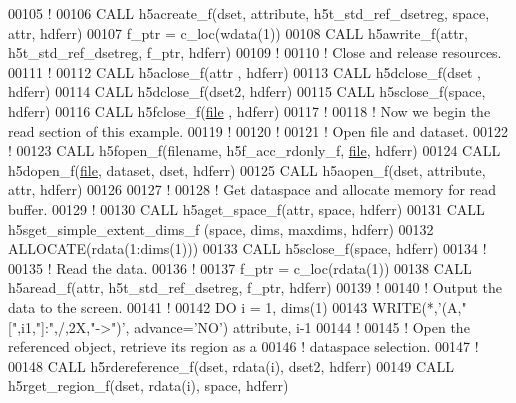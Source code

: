 \begin{DoxyCode}
00105   \textcolor{comment}{!}
00106   \textcolor{keyword}{CALL }h5acreate\_f(dset, attribute, h5t\_std\_ref\_dsetreg, space, attr, hdferr)
00107   f\_ptr = c\_loc(wdata(1))
00108   \textcolor{keyword}{CALL }h5awrite\_f(attr, h5t\_std\_ref\_dsetreg, f\_ptr, hdferr)
00109   \textcolor{comment}{!}
00110   \textcolor{comment}{! Close and release resources.}
00111   \textcolor{comment}{!}
00112   \textcolor{keyword}{CALL }h5aclose\_f(attr , hdferr)
00113   \textcolor{keyword}{CALL }h5dclose\_f(dset , hdferr)
00114   \textcolor{keyword}{CALL }h5dclose\_f(dset2, hdferr)
00115   \textcolor{keyword}{CALL }h5sclose\_f(space, hdferr)
00116   \textcolor{keyword}{CALL }h5fclose\_f(\hyperlink{structfile}{file} , hdferr)
00117   \textcolor{comment}{!}
00118   \textcolor{comment}{! Now we begin the read section of this example.}
00119   \textcolor{comment}{!}
00120   \textcolor{comment}{!}
00121   \textcolor{comment}{! Open file and dataset.}
00122   \textcolor{comment}{!}
00123   \textcolor{keyword}{CALL }h5fopen\_f(filename, h5f\_acc\_rdonly\_f, \hyperlink{structfile}{file}, hdferr)
00124   \textcolor{keyword}{CALL }h5dopen\_f(\hyperlink{structfile}{file}, dataset, dset, hdferr)
00125   \textcolor{keyword}{CALL }h5aopen\_f(dset, attribute, attr, hdferr)
00126 
00127   \textcolor{comment}{!}
00128   \textcolor{comment}{! Get dataspace and allocate memory for read buffer.}
00129   \textcolor{comment}{!}
00130   \textcolor{keyword}{CALL }h5aget\_space\_f(attr, space, hdferr)
00131   \textcolor{keyword}{CALL }h5sget\_simple\_extent\_dims\_f (space, dims, maxdims, hdferr)
00132   \textcolor{keyword}{ALLOCATE}(rdata(1:dims(1)))
00133   \textcolor{keyword}{CALL }h5sclose\_f(space, hdferr)
00134   \textcolor{comment}{!}
00135   \textcolor{comment}{! Read the data.}
00136   \textcolor{comment}{!}
00137   f\_ptr = c\_loc(rdata(1))
00138   \textcolor{keyword}{CALL }h5aread\_f(attr, h5t\_std\_ref\_dsetreg, f\_ptr, hdferr)
00139   \textcolor{comment}{!}
00140   \textcolor{comment}{! Output the data to the screen.}
00141   \textcolor{comment}{!}
00142   \textcolor{keywordflow}{DO} i = 1, dims(1)
00143      \textcolor{keyword}{WRITE}(*,\textcolor{stringliteral}{'(A,"[",i1,"]:",/,2X,"->")'}, advance=\textcolor{stringliteral}{'NO'}) attribute, i-1
00144      \textcolor{comment}{!}
00145      \textcolor{comment}{! Open the referenced object, retrieve its region as a}
00146      \textcolor{comment}{! dataspace selection.}
00147      \textcolor{comment}{!}
00148      \textcolor{keyword}{CALL }h5rdereference\_f(dset,  rdata(i), dset2, hdferr)
00149      \textcolor{keyword}{CALL }h5rget\_region\_f(dset, rdata(i), space, hdferr)

\end{DoxyCode}
